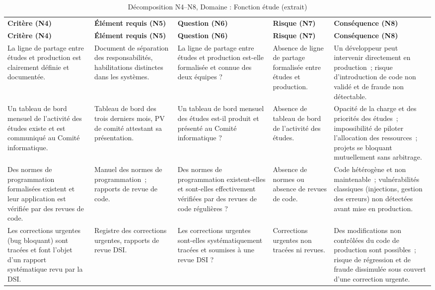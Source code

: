 \begin{longtable}{p{2.3cm}p{2.3cm}p{2.1cm}p{2.0cm}p{2.3cm}}
\small
\caption{Décomposition N4--N8, Domaine : Fonction étude (extrait)} \\
\toprule
\textbf{Critère (N4)} & \textbf{Élément requis (N5)} & \textbf{Question (N6)} & \textbf{Risque (N7)} & \textbf{Conséquence (N8)} \\
\midrule
\endfirsthead
\toprule
\textbf{Critère (N4)} & \textbf{Élément requis (N5)} & \textbf{Question (N6)} & \textbf{Risque (N7)} & \textbf{Conséquence (N8)} \\
\midrule
\endhead
\bottomrule
\endlastfoot

La ligne de partage entre études et production est clairement définie et documentée. &
Document de séparation des responsabilités, habilitations distinctes dans les systèmes. &
La ligne de partage entre études et production est-elle formalisée et connue des deux équipes ? &
Absence de ligne de partage formalisée entre études et production. &
Un développeur peut intervenir directement en production~; risque d'introduction de code non validé et de fraude non détectable. \\
\addlinespace

Un tableau de bord mensuel de l'activité des études existe et est communiqué au Comité informatique. &
Tableau de bord des trois derniers mois, PV de comité attestant sa présentation. &
Un tableau de bord mensuel des études est-il produit et présenté au Comité informatique ? &
Absence de tableau de bord de l'activité des études. &
Opacité de la charge et des priorités des études~; impossibilité de piloter l'allocation des ressources~; projets se bloquant mutuellement sans arbitrage. \\
\addlinespace

Des normes de programmation formalisées existent et leur application est vérifiée par des revues de code. &
Manuel des normes de programmation~; rapports de revue de code. &
Des normes de programmation existent-elles et sont-elles effectivement vérifiées par des revues de code régulières ? &
Absence de normes ou absence de revues de code. &
Code hétérogène et non maintenable~; vulnérabilités classiques (injections, gestion des erreurs) non détectées avant mise en production. \\
\addlinespace

Les corrections urgentes (bug bloquant) sont tracées et font l'objet d'un rapport systématique revu par la DSI. &
Registre des corrections urgentes, rapports de revue DSI. &
Les corrections urgentes sont-elles systématiquement tracées et soumises à une revue DSI ? &
Corrections urgentes non tracées ni revues. &
Des modifications non contrôlées du code de production sont possibles~; risque de régression et de fraude dissimulée sous couvert d'une correction urgente. \\

\end{longtable}

